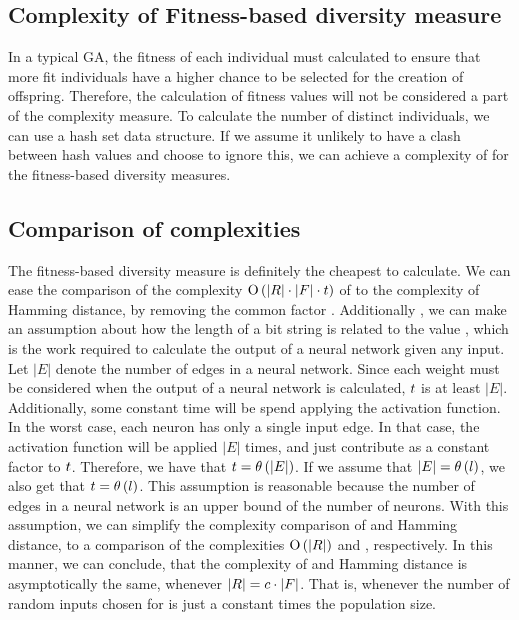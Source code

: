 \subsection{Complexity of Fitness-based diversity measure}
In a typical GA, the fitness of each individual must calculated to ensure that more fit individuals have a higher chance to be selected for the creation of offspring. Therefore, the calculation of fitness values will not be considered a part of the complexity measure. To calculate the number of distinct individuals, we can use a hash set data structure. If we assume it unlikely to have a clash between hash values and choose to ignore this, we can achieve a complexity of \bigO{\indsetl} for the fitness-based diversity measures.

\subsection{Comparison of complexities}
The fitness-based diversity measure is definitely the cheapest to calculate. We can ease the comparison of the complexity $\operatorname{O}\left(\lvert R\rvert\cdot\lvert F\rvert\cdot t\right)$ of \dia{} to the complexity \bigO{\indsetl^2 \cdot \bitstringl} of Hamming distance, by removing the common factor \indsetl. Additionally , we can make an assumption about how the length of a bit string \bitstringl{} is related to the value \timet, which is the work required to calculate the output of a neural network given any input. Let $|E|$ denote the number of edges in a neural network. Since each weight must be considered when the output of a neural network is calculated, $t${} is at least $|E|$. Additionally, some constant time will be spend applying the activation function. In the worst case, each neuron has only a single input edge. In that case, the activation function will be applied $|E|$ times, and just contribute as a constant factor to $t$. Therefore, we have that $t = \theta\left(|E|\right)$. If we assume that $|E| = \theta\left(l\right)$, we also get that $t = \theta\left(l\right)$. This assumption is reasonable because the number of edges in a neural network is an upper bound of the number of neurons. With this assumption, we can simplify the complexity comparison of \dia{} and Hamming distance, to a comparison of the complexities $\operatorname{O}\left(\lvert R\rvert\right)$ and \bigO{\indsetl}, respectively. In this manner, we can conclude, that the complexity of \dia{} and Hamming distance is asymptotically the same, whenever $\lvert R\rvert = c \cdot \lvert F\rvert$. That is, whenever the number of random inputs chosen for \dia{} is just a constant times the population size.
